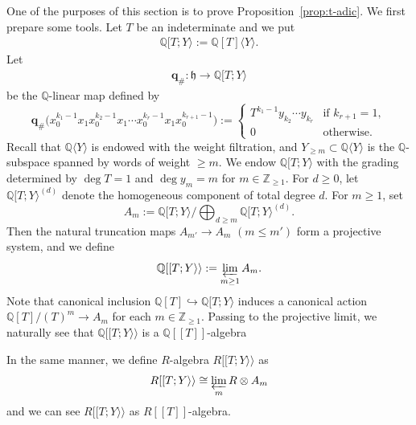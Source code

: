 \documentclass[15pt,oneside,reqno]{amsart}
\theoremstyle{remark}{
\newtheorem{lem}[df]{Lemma}
\newtheorem{prop}[df]{Proposition}
\newtheorem{ex}[df]{Example}
\newtheorem{rmk}[df]{Remark}
}
\newcommand{\ide}[1]{\mathfrak{#1}}
\newcommand{\Q}{\mathbb{Q}}
\begin{document}
One of the purposes of this section is to prove Proposition~\ref{prop:t-adic}.
We first prepare some tools.
Let $T$ be an indeterminate and
we put
\begin{align*}
\Q[T;Y\rangle := \Q[T]\langle Y \rangle.
\end{align*}
Let
\begin{align*}
\mathbf{q}_{\#}\colon \ide{h}\longrightarrow\Q[T;Y\rangle
\end{align*}
be the $\Q$-linear map defined by
\[
\mathbf{q}_{\#}\bigl(x_0^{k_1-1}x_1 x_0^{k_2-1}x_1 \cdots x_0^{k_r-1}x_1 x_0^{k_{r+1}-1}\bigr)
:=
\begin{cases}
T^{k_1-1} y_{k_2}\cdots y_{k_r} & \text{if } k_{r+1}=1,\\
0 & \text{otherwise.}
\end{cases}
\]
Recall that $\Q\langle Y\rangle$ is endowed with the weight filtration, and $Y_{\ge m}\subset \Q\langle Y\rangle$ is the $\Q$-subspace spanned by words of weight $\ge m$.
We endow $\Q[T;Y\rangle$ with the grading determined by $\deg T=1$ and $\deg y_m=m$ for $m\in \mathbb{Z}_{\ge 1}$.
For $d\ge0$, let $\Q[T;Y\rangle^{(d)}$ denote the homogeneous component of total degree $d$.
For $m\ge1$, set
\[
A_m :=\Q[T;Y\rangle \Big/ \bigoplus_{d\ge m} \Q[T;Y\rangle ^{(d)} .
\]
Then the natural truncation maps $A_{m'}\rightarrow A_m$ $(m\le m')$ form a projective system, and we define
\begin{equation*}\label{eq:lim-com}
\Q[[T;Y \rangle\rangle
:= \varprojlim_{m\ge1} A_m .
\end{equation*}
Note that  canonical inclusion $\Q[T] \hookrightarrow \Q[T; Y \rangle$ induces a canonical action $\Q[T]/(T)^m \rightarrow  A_m$ for each $m \in \mathbb{Z}_{\ge 1}$.
Passing to the projective limit, we naturally see that $\Q[[T; Y \rangle\rangle$ is a $\Q[[T]]$-algebra


In the same manner, we define $R$-algebra $R[[T;Y \rangle\rangle$ as
\[
R[[T;Y \rangle\rangle
\cong \varprojlim_{m} R\otimes A_m
\]
and we can see $R[[T;Y \rangle\rangle$ as $R[[T]]$-algebra.
\end{document}
